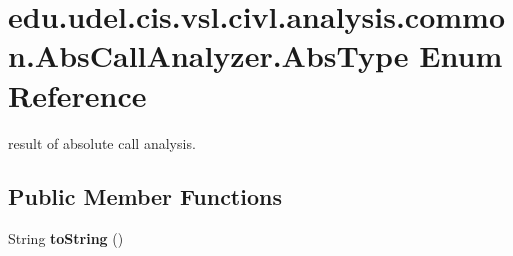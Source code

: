 \hypertarget{enumedu_1_1udel_1_1cis_1_1vsl_1_1civl_1_1analysis_1_1common_1_1AbsCallAnalyzer_1_1AbsType}{}\section{edu.\+udel.\+cis.\+vsl.\+civl.\+analysis.\+common.\+Abs\+Call\+Analyzer.\+Abs\+Type Enum Reference}
\label{enumedu_1_1udel_1_1cis_1_1vsl_1_1civl_1_1analysis_1_1common_1_1AbsCallAnalyzer_1_1AbsType}


result of absolute call analysis.  


\subsection*{Public Member Functions}
\begin{DoxyCompactItemize}
\item 
\hypertarget{enumedu_1_1udel_1_1cis_1_1vsl_1_1civl_1_1analysis_1_1common_1_1AbsCallAnalyzer_1_1AbsType_a0a1003fb240a4826e9ae37470c8e8381}{}String {\bfseries to\+String} ()\label{enumedu_1_1udel_1_1cis_1_1vsl_1_1civl_1_1analysis_1_1common_1_1AbsCallAnalyzer_1_1AbsType_a0a1003fb240a4826e9ae37470c8e8381}

\end{DoxyCompactItemize}
